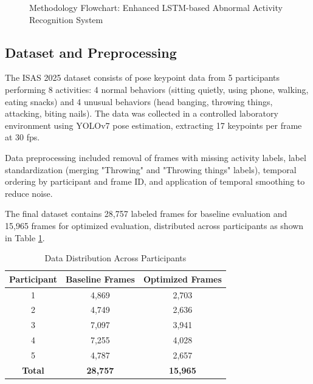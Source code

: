 \documentclass{iopconfser}
\begin{document}
\begin{figure}[H]
{
}
\caption{Methodology Flowchart: Enhanced LSTM-based Abnormal Activity Recognition System}
\label{fig:methodology_flowchart}
\end{figure}

\subsection{Dataset and Preprocessing}

The ISAS 2025 dataset consists of pose keypoint data from 5 participants performing 8 activities: 4 normal behaviors (sitting quietly, using phone, walking, eating snacks) and 4 unusual behaviors (head banging, throwing things, attacking, biting nails). The data was collected in a controlled laboratory environment using YOLOv7 pose estimation, extracting 17 keypoints per frame at 30 fps.

Data preprocessing included removal of frames with missing activity labels, label standardization (merging "Throwing" and "Throwing things" labels), temporal ordering by participant and frame ID, and application of temporal smoothing to reduce noise.

The final dataset contains 28,757 labeled frames for baseline evaluation and 15,965 frames for optimized evaluation, distributed across participants as shown in Table \ref{tab:data_distribution}.

\begin{table}[H]
\centering
\caption{Data Distribution Across Participants}
\label{tab:data_distribution}
\begin{tabular}{ccc}
\toprule
\textbf{Participant} & \textbf{Baseline Frames} & \textbf{Optimized Frames} \\
\midrule
1 & 4,869 & 2,703 \\
2 & 4,749 & 2,636 \\
3 & 7,097 & 3,941 \\
4 & 7,255 & 4,028 \\
5 & 4,787 & 2,657 \\
\midrule
\textbf{Total} & \textbf{28,757} & \textbf{15,965} \\
\bottomrule
\end{tabular}
\end{table}
\end{document}
